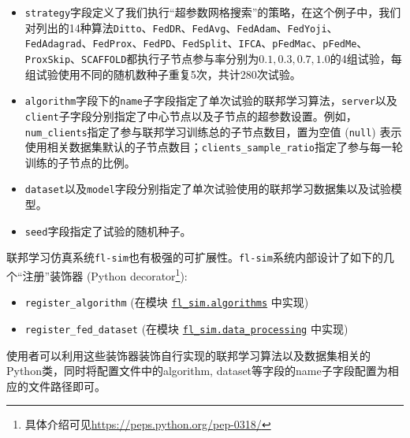 \begin{itemize}
    \item \texttt{strategy}字段定义了我们执行``超参数网格搜索''的策略，在这个例子中，我们对列出的14种算法\texttt{Ditto}、\texttt{FedDR}、\texttt{FedAvg}、\texttt{FedAdam}、\texttt{FedYoji}、\texttt{FedAdagrad}、\texttt{FedProx}、\texttt{FedPD}、\texttt{FedSplit}、\texttt{IFCA}、\texttt{pFedMac}、\texttt{pFedMe}、\texttt{ProxSkip}、\texttt{SCAFFOLD}都执行子节点参与率分别为$0.1, 0.3, 0.7, 1.0$的4组试验，每组试验使用不同的随机数种子重复5次，共计280次试验。
    \item \texttt{algorithm}字段下的\texttt{name}子字段指定了单次试验的联邦学习算法，\texttt{server}以及\texttt{client}子字段分别指定了中心节点以及子节点的超参数设置。例如，\texttt{num\_clients}指定了参与联邦学习训练总的子节点数目，置为空值 (\texttt{null}) 表示使用相关数据集默认的子节点数目；\texttt{clients\_sample\_ratio}指定了参与每一轮训练的子节点的比例。
    \item \texttt{dataset}以及\texttt{model}字段分别指定了单次试验使用的联邦学习数据集以及试验模型。
    \item \texttt{seed}字段指定了试验的随机种子。
\end{itemize}

联邦学习仿真系统\texttt{fl-sim}也有极强的可扩展性。\texttt{fl-sim}系统内部设计了如下的几个``注册''装饰器 (Python decorator\footnote{具体介绍可见\url{https://peps.python.org/pep-0318/}}):
\begin{itemize}
    \item \verb|register_algorithm| (在模块 \href{https://github.com/wenh06/fl-sim/blob/master/fl_sim/algorithms/_register.py}{\texttt{fl\_sim.algorithms}} 中实现)
    \item \verb|register_fed_dataset| (在模块 \href{https://github.com/wenh06/fl-sim/blob/master/fl_sim/data_processing/_register.py}{\texttt{fl\_sim.data\_processing}} 中实现)
\end{itemize}
使用者可以利用这些装饰器装饰自行实现的联邦学习算法以及数据集相关的Python类，同时将配置文件中的algorithm, dataset等字段的name子字段配置为相应的文件路径即可。

